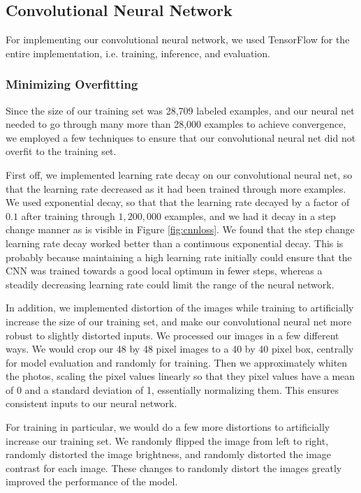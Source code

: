 \documentclass[11pt, twocolumn, twoside]{article}
\begin{document}
\subsection{Convolutional Neural Network}

For implementing our convolutional neural network, we used TensorFlow for the entire implementation, i.e. training, inference, and evaluation.

\subsubsection{Minimizing Overfitting}

Since the size of our training set was 28,709 labeled examples, and our neural net needed to go through many more than 28,000 examples to achieve convergence, we employed a few techniques to ensure that our convolutional neural net did not overfit to the training set.

First off, we implemented learning rate decay on our convolutional neural net, so that the learning rate decreased as it had been trained through more examples. We used exponential decay, so that that the learning rate decayed by a factor of $0.1$ after training through $1,200,000$ examples, and we had it decay in a step change manner as is visible in Figure \ref{fig:cnnloss}. We found that the step change learning rate decay worked better than a continuous exponential decay. This is probably because maintaining a high learning rate initially could ensure that the CNN was trained towards a good local optimum in fewer steps, whereas a steadily decreasing learning rate could limit the range of the neural network.

In addition, we implemented distortion of the images while training to artificially increase the size of our training set, and make our convolutional neural net more robust to slightly distorted inputs. We processed our images in a few different ways. We would crop our 48 by 48 pixel images to a 40 by 40 pixel box, centrally for model evaluation and randomly for training. Then we approximately whiten the photos, scaling the pixel values linearly so that they pixel values have a mean of 0 and a standard deviation of 1, essentially normalizing them. This ensures consistent inputs to our neural network.

For training in particular, we would do a few more distortions to artificially increase our training set. We randomly flipped the image from left to right, randomly distorted the image brightness, and 	randomly distorted the image contrast for each image. These changes to randomly distort the images greatly improved the performance of the model.
\end{document}
